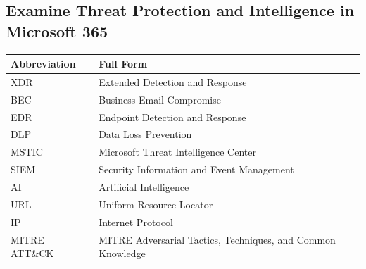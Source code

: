 \documentclass[10pt]{article}
\begin{document}
\subsection{Examine Threat Protection and Intelligence in Microsoft 365}

\begin{center}
\begin{tabular}{>{\raggedright\arraybackslash}p{} >{\raggedright\arraybackslash}p{}}
\toprule
\textbf{Abbreviation} & \textbf{Full Form} \\
\midrule
XDR & Extended Detection and Response \\
BEC & Business Email Compromise \\
EDR & Endpoint Detection and Response \\
DLP & Data Loss Prevention \\
MSTIC & Microsoft Threat Intelligence Center \\
SIEM & Security Information and Event Management \\
AI & Artificial Intelligence \\
URL & Uniform Resource Locator \\
IP & Internet Protocol \\
MITRE ATT\&CK & MITRE Adversarial Tactics, Techniques, and Common Knowledge \\
\bottomrule
\end{tabular}
\end{center}
\end{document}
